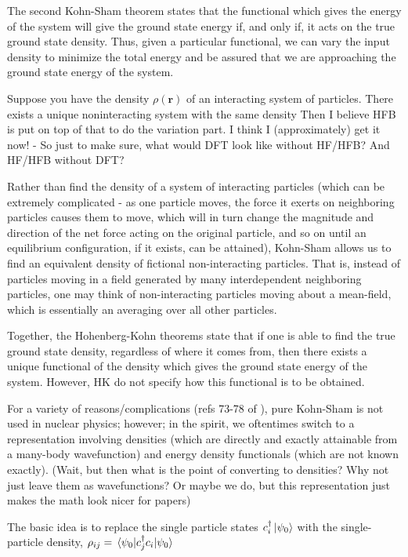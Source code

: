 The second Kohn-Sham theorem states that the functional which gives the energy of the system will give the ground state energy if, and only if, it acts on the true ground state density. Thus, given a particular functional, we can vary the input density to minimize the total energy and be assured that we are approaching the ground state energy of the system.

Suppose you have the density $\rho(\mathbf{r})$ of an interacting system of particles. There exists a unique noninteracting system with the same density
Then I believe HFB is put on top of that to do the variation part. I think I (approximately) get it now! - So just to make sure, what would DFT look like without HF/HFB? And HF/HFB without DFT?

Rather than find the density of a system of interacting particles (which can be extremely complicated - as one particle moves, the force it exerts on neighboring particles causes them to move, which will in turn change the magnitude and direction of the net force acting on the original particle, and so on until an equilibrium configuration, if it exists, can be attained), Kohn-Sham allows us to find an equivalent density of fictional non-interacting particles. That is, instead of particles moving in a field generated by many interdependent neighboring particles, one may think of non-interacting particles moving about a mean-field, which is essentially an averaging over all other particles.

Together, the Hohenberg-Kohn theorems state that if one is able to find the true ground state density, regardless of where it comes from, then there exists a unique functional of the density which gives the ground state energy of the system. However, HK do not specify how this functional is to be obtained.

For a variety of reasons/complications (refs 73-78 of \cite{Schunck2016}), pure Kohn-Sham is not used in nuclear physics; however; in the spirit, we oftentimes switch to a representation involving densities (which are directly and exactly attainable from a many-body wavefunction) and energy density functionals (which are not known exactly). (Wait, but then what is the point of converting to densities? Why not just leave them as wavefunctions? Or maybe we do, but this representation just makes the math look nicer for papers)

The basic idea is to replace the single particle states $c_i^\dagger\ket{\psi_0}$ with the single-particle density, $\rho_{ij} = \expval{c_j^\dagger c_i}{\psi_0}$

